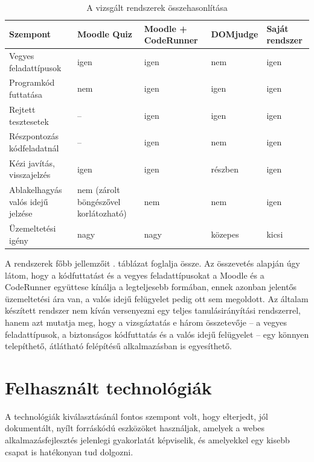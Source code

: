 \begin{table}[H]
  \centering
  \caption{A vizsgált rendszerek összehasonlítása}
  \label{tab:osszehasonlitas}
  \small
  \begin{tabularx}{\textwidth}{@{}>{\raggedright\arraybackslash}X>{\centering\arraybackslash}p{2.5cm}>{\centering\arraybackslash}p{2.6cm}>{\centering\arraybackslash}p{2.0cm}>{\centering\arraybackslash}p{2.0cm}@{}}
    \toprule
    Szempont & Moodle Quiz & Moodle + CodeRunner & DOMjudge & Saját rendszer \\
    \midrule
    Vegyes feladattípusok        & igen & igen & nem & igen \\
    Programkód futtatása         & nem & igen & igen & igen \\
    Rejtett tesztesetek          & -- & igen & igen & igen \\
    Részpontozás kódfeladatnál   & -- & igen & nem & igen \\
    Kézi javítás, visszajelzés   & igen & igen & részben & igen \\
    Ablakelhagyás valós idejű jelzése & nem (zárolt böngészővel korlátozható) & nem & nem & igen \\
    Üzemeltetési igény           & nagy & nagy & közepes & kicsi \\
    \bottomrule
  \end{tabularx}
\end{table}

A rendszerek főbb jellemzőit . táblázat foglalja össze. Az összevetés
alapján úgy látom, hogy a kódfuttatást és a vegyes feladattípusokat a Moodle és a CodeRunner
együttese kínálja a legteljesebb formában, ennek azonban jelentős üzemeltetési ára van, a valós
idejű felügyelet pedig ott sem megoldott. Az általam készített rendszer nem kíván versenyezni egy
teljes tanulásirányítási rendszerrel, hanem azt mutatja meg, hogy a vizsgáztatás e három
összetevője -- a vegyes feladattípusok, a biztonságos kódfuttatás és a valós idejű felügyelet --
egy könnyen telepíthető, átlátható felépítésű alkalmazásban is egyesíthető.

\section{Felhasznált technológiák}
\label{sec:technologiak}

A technológiák kiválasztásánál fontos szempont volt, hogy elterjedt, jól dokumentált, nyílt
forráskódú eszközöket használjak, amelyek a webes alkalmazásfejlesztés jelenlegi gyakorlatát
képviselik, és amelyekkel egy kisebb csapat is hatékonyan tud dolgozni.

